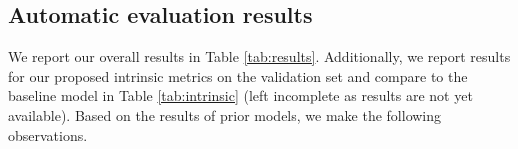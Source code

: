 \documentclass[11pt,a4paper]{article}
\begin{document}



\subsection{Automatic evaluation results}
We report our overall results in Table \ref{tab:results}. Additionally, we report results for our proposed intrinsic metrics on the validation set and compare to the baseline model in Table \ref{tab:intrinsic} (left incomplete as results are not yet available). Based on the results of prior models, we make the following observations.
\end{document}
